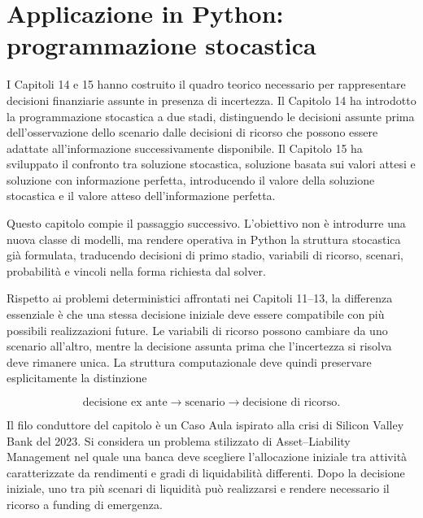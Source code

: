 

\chapter{Applicazione in Python: programmazione stocastica}

\label{cap:python-programmazione-stocastica}

I Capitoli 14 e 15 hanno costruito il quadro teorico necessario per
rappresentare decisioni finanziarie assunte in presenza di incertezza. Il
Capitolo 14 ha introdotto la programmazione stocastica a due stadi, distinguendo
le decisioni assunte prima dell'osservazione dello scenario dalle decisioni di
ricorso che possono essere adattate all'informazione successivamente
disponibile. Il Capitolo 15 ha sviluppato il confronto tra soluzione
stocastica, soluzione basata sui valori attesi e soluzione con informazione
perfetta, introducendo il valore della soluzione stocastica e il valore
atteso dell'informazione perfetta.

Questo capitolo compie il passaggio successivo. L'obiettivo non \`e introdurre
una nuova classe di modelli, ma rendere operativa in Python la struttura
stocastica gi\`a formulata, traducendo decisioni di primo stadio, variabili di
ricorso, scenari, probabilit\`a e vincoli nella forma richiesta dal solver.

Rispetto ai problemi deterministici affrontati nei Capitoli 11--13, la
differenza essenziale \`e che una stessa decisione iniziale deve essere
compatibile con pi\`u possibili realizzazioni future. Le variabili di ricorso
possono cambiare da uno scenario all'altro, mentre la decisione assunta prima
che l'incertezza si risolva deve rimanere unica. La struttura computazionale
deve quindi preservare esplicitamente la distinzione

\[
\text{decisione ex ante}
\longrightarrow
\text{scenario}
\longrightarrow
\text{decisione di ricorso}.
\]


Il filo conduttore del capitolo \`e un Caso Aula ispirato alla crisi di
Silicon Valley Bank del 2023. Si considera un problema stilizzato di
Asset--Liability Management nel quale una banca deve scegliere l'allocazione
iniziale tra attivit\`a caratterizzate da rendimenti e gradi di liquidabilit\`a
differenti. Dopo la decisione iniziale, uno tra pi\`u scenari di liquidit\`a
pu\`o realizzarsi e rendere necessario il ricorso a funding di emergenza.

